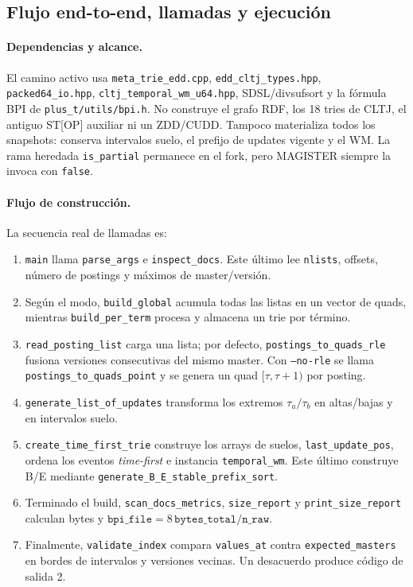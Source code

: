 \subsection{Flujo end-to-end, llamadas y ejecución}
\label{subsec:metatrie-end-to-end}

\paragraph{Dependencias y alcance.}
El camino activo usa \texttt{meta\_trie\_edd.cpp},
\texttt{edd\_cltj\_types.hpp}, \texttt{packed64\_io.hpp},
\texttt{cltj\_temporal\_wm\_u64.hpp}, SDSL/divsufsort y la fórmula BPI de
\texttt{plus\_t/utils/bpi.h}. No construye el grafo RDF, los 18 tries de CLTJ,
el antiguo ST[OP] auxiliar ni un ZDD/CUDD. Tampoco materializa todos los
snapshots: conserva intervalos suelo, el prefijo de updates vigente y el WM.
La rama heredada \texttt{is\_partial} permanece en el fork, pero MAGISTER
siempre la invoca con \texttt{false}.

\paragraph{Flujo de construcción.}
La secuencia real de llamadas es:
\begin{enumerate}
\item \texttt{main} llama \texttt{parse\_args} e \texttt{inspect\_docs}.
      Este último lee \texttt{nlists}, offsets, número de postings y máximos de
      master/versión.
\item Según el modo, \texttt{build\_global} acumula todas las listas en un
      vector de quads, mientras \texttt{build\_per\_term} procesa y almacena
      un trie por término.
\item \texttt{read\_posting\_list} carga una lista; por defecto,
      \texttt{postings\_to\_quads\_rle} fusiona versiones consecutivas del
      mismo master. Con \texttt{--no-rle} se llama
      \texttt{postings\_to\_quads\_point} y se genera un quad
      $[\tau,\tau+1)$ por posting.
\item \texttt{generate\_list\_of\_updates} transforma los extremos
      $\tau_a/\tau_b$ en altas/bajas y en intervalos suelo.
\item \texttt{create\_time\_first\_trie} construye los arrays de suelos,
      \texttt{last\_update\_pos}, ordena los eventos \emph{time-first} e
      instancia \texttt{temporal\_wm}. Este último construye B/E mediante
      \texttt{generate\_B\_E\_stable\_prefix\_sort}.
\item Terminado el build, \texttt{scan\_docs\_metrics},
      \texttt{size\_report} y \texttt{print\_size\_report} calculan bytes y
      $\texttt{bpi\_file}=8\,\texttt{bytes\_total}/\texttt{n\_raw}$.
\item Finalmente, \texttt{validate\_index} compara
      \texttt{values\_at} contra \texttt{expected\_masters} en bordes de
      intervalos y versiones vecinas. Un desacuerdo produce código de salida 2.
\end{enumerate}

